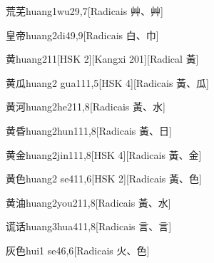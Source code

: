 \begin{entry}{荒芜}{huang1wu2}{9,7}[Radicais ⾋、⾋]
\end{entry}

\begin{entry}{皇帝}{huang2di4}{9,9}[Radicais ⽩、⼱]
\end{entry}

\begin{entry}{黄}{huang2}{11}[HSK 2][Kangxi 201][Radical ⿈]
\end{entry}

\begin{entry}{黄瓜}{huang2 gua1}{11,5}[HSK 4][Radicais ⿈、⽠]
\end{entry}

\begin{entry}{黄河}{huang2he2}{11,8}[Radicais ⿈、⽔]
\end{entry}

\begin{entry}{黄昏}{huang2hun1}{11,8}[Radicais ⿈、⽇]
\end{entry}

\begin{entry}{黄金}{huang2jin1}{11,8}[HSK 4][Radicais ⿈、⾦]
\end{entry}

\begin{entry}{黄色}{huang2 se4}{11,6}[HSK 2][Radicais ⿈、⾊]
\end{entry}

\begin{entry}{黄油}{huang2you2}{11,8}[Radicais ⿈、⽔]
\end{entry}

\begin{entry}{谎话}{huang3hua4}{11,8}[Radicais ⾔、⾔]
\end{entry}

\begin{entry}{灰色}{hui1 se4}{6,6}[Radicais ⽕、⾊]
\end{entry}

